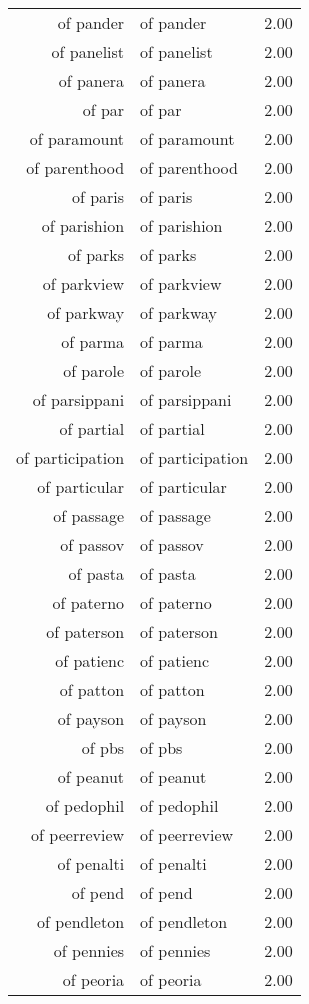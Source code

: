 \begin{table}[ht]
\begin{tabular}{rlr}
  of pander & of pander & 2.00 \\ 
  of panelist & of panelist & 2.00 \\ 
  of panera & of panera & 2.00 \\ 
  of par & of par & 2.00 \\ 
  of paramount & of paramount & 2.00 \\ 
  of parenthood & of parenthood & 2.00 \\ 
  of paris & of paris & 2.00 \\ 
  of parishion & of parishion & 2.00 \\ 
  of parks & of parks & 2.00 \\ 
  of parkview & of parkview & 2.00 \\ 
  of parkway & of parkway & 2.00 \\ 
  of parma & of parma & 2.00 \\ 
  of parole & of parole & 2.00 \\ 
  of parsippani & of parsippani & 2.00 \\ 
  of partial & of partial & 2.00 \\ 
  of participation & of participation & 2.00 \\ 
  of particular & of particular & 2.00 \\ 
  of passage & of passage & 2.00 \\ 
  of passov & of passov & 2.00 \\ 
  of pasta & of pasta & 2.00 \\ 
  of paterno & of paterno & 2.00 \\ 
  of paterson & of paterson & 2.00 \\ 
  of patienc & of patienc & 2.00 \\ 
  of patton & of patton & 2.00 \\ 
  of payson & of payson & 2.00 \\ 
  of pbs & of pbs & 2.00 \\ 
  of peanut & of peanut & 2.00 \\ 
  of pedophil & of pedophil & 2.00 \\ 
  of peerreview & of peerreview & 2.00 \\ 
  of penalti & of penalti & 2.00 \\ 
  of pend & of pend & 2.00 \\ 
  of pendleton & of pendleton & 2.00 \\ 
  of pennies & of pennies & 2.00 \\ 
  of peoria & of peoria & 2.00 \\ 

\end{tabular}
\end{table}
